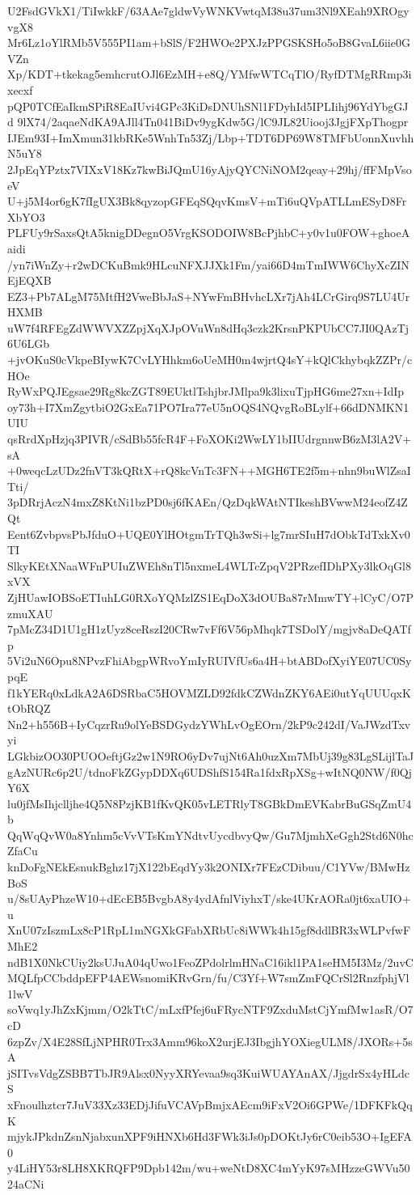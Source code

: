 U2FsdGVkX1/TiIwkkF/63AAe7gldwVyWNKVwtqM38u37um3Nl9XEah9XROgyvgX8
Mr6Lz1oYlRMb5V555PI1am+bSlS/F2HWOe2PXJzPPGSKSHo5oB8GvaL6iie0GVZn
Xp/KDT+tkekag5emhcrutOJl6EzMH+e8Q/YMfwWTCqTlO/RyfDTMgRRmp3ixecxf
pQP0TCfEaIkmSPiR8EaIUvi4GPc3KiDsDNUhSNl1FDyhId5IPLIihj96YdYbgGJd
9lX74/2aqaeNdKA9AJll4Tn041BiDv9ygKdw5G/lC9JL82Uiooj3JgjFXpThogpr
IJEm93I+ImXmun31kbRKe5WnhTn53Zj/Lbp+TDT6DP69W8TMFbUonnXuvhhN5uY8
2JpEqYPztx7VIXxV18Kz7kwBiJQmU16yAjyQYCNiNOM2qeay+29hj/ffFMpVsoeV
U+j5M4or6gK7fIgUX3Bk8qyzopGFEqSQqvKmsV+mTi6uQVpATLLmESyD8FrXbYO3
PLFUy9rSaxsQtA5knigDDegnO5VrgKSODOIW8BcPjhbC+y0v1u0FOW+ghoeAaidi
/yn7iWnZy+r2wDCKuBmk9HLcuNFXJJXk1Fm/yai66D4mTmIWW6ChyXcZINEjEQXB
EZ3+Pb7ALgM75MtfH2VweBbJaS+NYwFmBHvhcLXr7jAh4LCrGirq9S7LU4UrHXMB
uW7f4RFEgZdWWVXZZpjXqXJpOVuWn8dHq3czk2KrsnPKPUbCC7JI0QAzTj6U6LGb
+jvOKuS0cVkpeBIywK7CvLYHhkm6oUeMH0m4wjrtQ4sY+kQlCkhybqkZZPr/cHOe
RyWxPQJEgsae29Rg8kcZGT89EUktlTshjbrJMlpa9k3lixuTjpHG6me27xn+IdIp
oy73h+I7XmZgytbiO2GxEa71PO7Ira77eU5nOQS4NQvgRoBLylf+66dDNMKN1UIU
qsRrdXpHzjq3PIVR/cSdBb55fcR4F+FoXOKi2WwLY1bIIUdrgnnwB6zM3lA2V+sA
+0weqcLzUDz2fnVT3kQRtX+rQ8kcVnTc3FN++MGH6TE2f5m+nhn9buWlZsaITti/
3pDRrjAczN4mxZ8KtNi1bzPD0sj6fKAEn/QzDqkWAtNTIkeshBVwwM24eofZ4ZQt
Eent6ZvbpvsPbJfduO+UQE0YlHOtgmTrTQh3wSi+lg7mrSIuH7dObkTdTxkXv0TI
SlkyKEtXNaaWFnPUIuZWEh8nTl5nxmeL4WLTcZpqV2PRzefIDhPXy3lkOqGl8xVX
ZjHUawIOBSoETIuhLG0RXoYQMzlZS1EqDoX3dOUBa87rMmwTY+lCyC/O7PzmuXAU
7pMcZ34D1U1gH1zUyz8ceRszI20CRw7vFf6V56pMhqk7TSDolY/mgjv8aDeQATfp
5Vi2uN6Opu8NPvzFhiAbgpWRvoYmIyRUIVfUs6a4H+btABDofXyiYE07UC0SypqE
f1kYERq0xLdkA2A6DSRbaC5HOVMZLD92fdkCZWdnZKY6AEi0utYqUUUqxKtObRQZ
Nn2+h556B+IyCqzrRu9olYeBSDGydzYWhLvOgEOrn/2kP9c242dI/VaJWzdTxvyi
LGkbizOO30PUOOeftjGz2w1N9RO6yDv7ujNt6Ah0uzXm7MbUj39g83LgSLijlTaJ
gAzNURc6p2U/tdnoFkZGypDDXq6UDShfS154Ra1fdxRpXSg+wItNQ0NW/f0QjY6X
lu0jfMsIhjclljhe4Q5N8PzjKB1fKvQK05vLETRlyT8GBkDmEVKabrBuGSqZmU4b
QqWqQvW0a8Ynhm5cVvVTsKmYNdtvUycdbvyQw/Gu7MjmhXeGgh2Std6N0hcZfaCu
knDoFgNEkEsnukBghz17jX122bEqdYy3k2ONIXr7FEzCDibuu/C1YVw/BMwHzBoS
u/8sUAyPhzeW10+dEcEB5BvgbA8y4ydAfnlViyhxT/ske4UKrAORa0jt6xaUIO+u
XnU07zIszmLx8cP1RpL1mNGXkGFabXRbUc8iWWk4h15gf8ddlBR3xWLPvfwFMhE2
ndB1X0NkCUiy2ksUJuA04qUwo1FeoZPdolrlmHNaC16ikl1PA1seHM5I3Mz/2uvC
MQLfpCCbddpEFP4AEWsnomiKRvGrn/fu/C3Yf+W7smZmFQCrSl2RnzfphjVl1lwV
soVwq1yJhZxKjmm/O2kTtC/mLxfPfej6uFRycNTF9ZxduMstCjYmfMw1asR/O7cD
6zpZv/X4E28SfLjNPHR0Trx3Amm96koX2urjEJ3IbgjhYOXiegULM8/JXORs+5sA
jSITvsVdgZSBB7TbJR9Alsx0NyyXRYevaa9sq3KuiWUAYAnAX/JjgdrSx4yHLdcS
xFnoulhztcr7JuV33Xz33EDjJifuVCAVpBmjxAEcm9iFxV2Oi6GPWe/1DFKFkQqK
mjykJPkdnZsnNjabxunXPF9iHNXb6Hd3FWk3iJs0pDOKtJy6rC0eib53O+IgEFA0
y4LiHY53r8LH8XKRQFP9Dpb142m/wu+weNtD8XC4mYyK97sMHzzeGWVu5024aCNi
